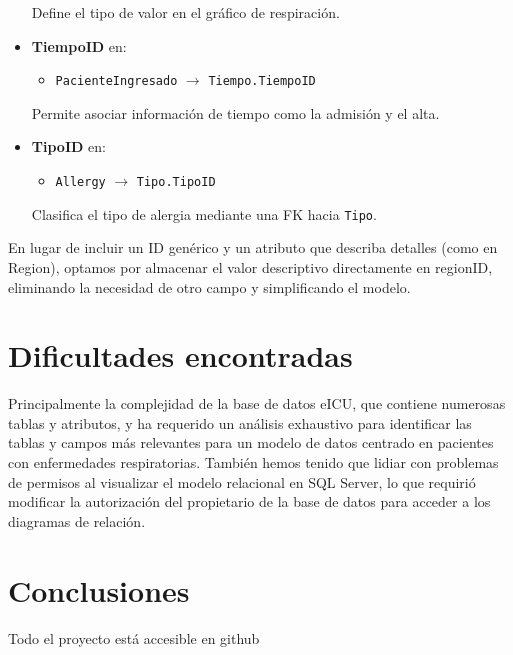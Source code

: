 \documentclass[12pt, a4paper, twoside]{article}
\begin{document}
\begin{itemize}
		Define el tipo de valor en el gráfico de respiración.
		
		\item \textbf{TiempoID} en:
		\begin{itemize}
			\item \texttt{PacienteIngresado} $\rightarrow$ \texttt{Tiempo.TiempoID}
		\end{itemize}
		
		Permite asociar información de tiempo como la admisión y el alta.
		
		\item \textbf{TipoID} en:
		\begin{itemize}
			\item \texttt{Allergy} $\rightarrow$ \texttt{Tipo.TipoID}
		\end{itemize}
		
		Clasifica el tipo de alergia mediante una FK hacia \texttt{Tipo}.
		
	\end{itemize}
	
	
	En lugar de incluir un ID genérico y un atributo que describa detalles (como en Region), optamos por almacenar el valor descriptivo directamente en regionID, eliminando la necesidad de otro campo y simplificando el modelo.
	
	\section{Dificultades encontradas}
	
	Principalmente la complejidad de la base de datos eICU, que contiene numerosas tablas y atributos, y ha requerido un análisis exhaustivo para identificar las tablas y campos más relevantes para un modelo de datos centrado en pacientes con enfermedades respiratorias. También hemos tenido que lidiar con problemas de permisos al visualizar el modelo relacional en SQL Server, lo que requirió modificar la autorización del propietario de la base de datos para acceder a los diagramas de relación.
	
	\section{Conclusiones}

	Todo el proyecto está accesible en github \cite{depab2024}
	\printbibliography
	
	
	
	
\end{document}
